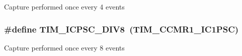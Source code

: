 Capture performed once every 4 events \hypertarget{group___t_i_m___input___capture___prescaler_ga5086cb03c89a5c67b199d20b605f00cb}{
\subsubsection[{T\-I\-M\-\_\-\-I\-C\-P\-S\-C\-\_\-\-D\-I\-V8}]{\setlength{\rightskip}{0pt plus 5cm}\#define T\-I\-M\-\_\-\-I\-C\-P\-S\-C\-\_\-\-D\-I\-V8~({\bf T\-I\-M\-\_\-\-C\-C\-M\-R1\-\_\-\-I\-C1\-P\-S\-C})}}\label{group___t_i_m___input___capture___prescaler_ga5086cb03c89a5c67b199d20b605f00cb}
Capture performed once every 8 events 